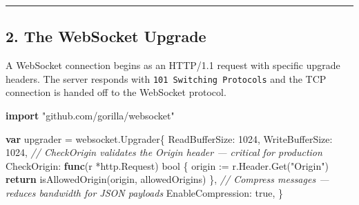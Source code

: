 \documentclass[
]{article}
\newenvironment{Shaded}{}{}
\newcommand{\CommentTok}[1]{\textcolor[rgb]{0.38,0.63,0.69}{\textit{#1}}}
\newcommand{\ControlFlowTok}[1]{\textcolor[rgb]{0.00,0.44,0.13}{\textbf{#1}}}
\newcommand{\DataTypeTok}[1]{\textcolor[rgb]{0.56,0.13,0.00}{#1}}
\newcommand{\DecValTok}[1]{\textcolor[rgb]{0.25,0.63,0.44}{#1}}
\newcommand{\KeywordTok}[1]{\textcolor[rgb]{0.00,0.44,0.13}{\textbf{#1}}}
\newcommand{\NormalTok}[1]{#1}
\newcommand{\OperatorTok}[1]{\textcolor[rgb]{0.40,0.40,0.40}{#1}}
\newcommand{\OtherTok}[1]{\textcolor[rgb]{0.00,0.44,0.13}{#1}}
\newcommand{\StringTok}[1]{\textcolor[rgb]{0.25,0.44,0.63}{#1}}
\begin{document}
\begin{center}\rule{0.5\linewidth}{0.5pt}\end{center}

\hypertarget{the-websocket-upgrade}{%
\subsection{2. The WebSocket Upgrade}\label{the-websocket-upgrade}}

A WebSocket connection begins as an HTTP/1.1 request with specific
upgrade headers. The server responds with
\texttt{101\ Switching\ Protocols} and the TCP connection is handed off
to the WebSocket protocol.

\begin{Shaded}
\begin{Highlighting}[]
\KeywordTok{import} \StringTok{"github.com/gorilla/websocket"}

\KeywordTok{var}\NormalTok{ upgrader }\OperatorTok{=}\NormalTok{ websocket}\OperatorTok{.}\NormalTok{Upgrader}\OperatorTok{\{}
\NormalTok{    ReadBufferSize}\OperatorTok{:}  \DecValTok{1024}\OperatorTok{,}
\NormalTok{    WriteBufferSize}\OperatorTok{:} \DecValTok{1024}\OperatorTok{,}
    \CommentTok{// CheckOrigin validates the Origin header — critical for production}
\NormalTok{    CheckOrigin}\OperatorTok{:} \KeywordTok{func}\OperatorTok{(}\NormalTok{r }\OperatorTok{*}\NormalTok{http}\OperatorTok{.}\NormalTok{Request}\OperatorTok{)} \DataTypeTok{bool} \OperatorTok{\{}
\NormalTok{        origin }\OperatorTok{:=}\NormalTok{ r}\OperatorTok{.}\NormalTok{Header}\OperatorTok{.}\NormalTok{Get}\OperatorTok{(}\StringTok{"Origin"}\OperatorTok{)}
        \ControlFlowTok{return}\NormalTok{ isAllowedOrigin}\OperatorTok{(}\NormalTok{origin}\OperatorTok{,}\NormalTok{ allowedOrigins}\OperatorTok{)}
    \OperatorTok{\},}
    \CommentTok{// Compress messages — reduces bandwidth for JSON payloads}
\NormalTok{    EnableCompression}\OperatorTok{:} \OtherTok{true}\OperatorTok{,}
\OperatorTok{\}}


\end{Highlighting}
\end{Shaded}
\end{document}

